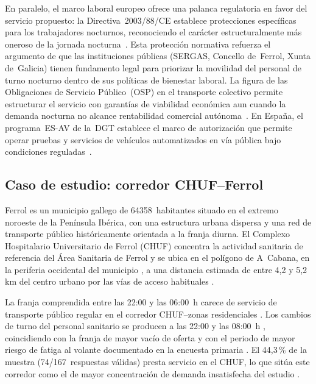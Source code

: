 En paralelo, el marco laboral europeo ofrece una palanca regulatoria en
favor del servicio propuesto: la Directiva~2003/88/CE establece
protecciones específicas para los trabajadores nocturnos, reconociendo el
carácter estructuralmente más oneroso de la jornada
nocturna~\parencite{Directiva200388CE}. Esta protección normativa
refuerza el argumento de que las instituciones públicas (SERGAS, Concello
de~Ferrol, Xunta de~Galicia) tienen fundamento legal para priorizar la
movilidad del personal de turno nocturno dentro de sus políticas de
bienestar laboral. La figura de las Obligaciones de Servicio
Público~(OSP) en el transporte colectivo permite estructurar el servicio
con garantías de viabilidad económica aun cuando la demanda nocturna no
alcance rentabilidad comercial autónoma~\parencite{UITP2024}. En España,
el programa~ES-AV de la~DGT establece el marco de autorización que
permite operar pruebas y servicios de vehículos automatizados en vía
pública bajo condiciones reguladas~\parencite{DGTESAV2026}.

\subsection{Caso de estudio: corredor CHUF--Ferrol}
\label{sec:caso-ferrol}

Ferrol es un municipio gallego de \num{64358}~habitantes
\parencite{INE2024Ferrol} situado en el extremo noroeste de la
Península Ibérica, con una estructura urbana dispersa y una red de
transporte público históricamente orientada a la franja diurna. El
Complexo Hospitalario Universitario de Ferrol (CHUF) concentra la
actividad sanitaria de referencia del Área Sanitaria de Ferrol y se
ubica en el polígono de A~Cabana, en la periferia occidental del
municipio \parencite{Sanidad2024CHUF}, a una distancia estimada de entre
4,2 y 5,2\,km del centro urbano por las vías de acceso habituales
\parencite{GoogleMaps2026Ferrol}.

La franja comprendida entre las 22:00 y las 06:00~h carece de servicio
de transporte público regular en el corredor CHUF--zonas residenciales
\parencite{Alsaferrol2024horarios,RenfeCercaniasFerrol2026}. Los cambios
de turno del personal sanitario se producen a las 22:00 y las 08:00~h
\parencite{XuntaGalicia2025dog}, coincidiendo con la franja de mayor
vacío de oferta y con el periodo de mayor riesgo de fatiga al volante
documentado en la encuesta primaria \parencite{LouridoRegueira2026}. El
44,3\,\% de la muestra (74/167~respuestas válidas) presta servicio en el
CHUF, lo que sitúa este corredor como el de mayor concentración de
demanda insatisfecha del estudio \parencite{LouridoRegueira2026}.

